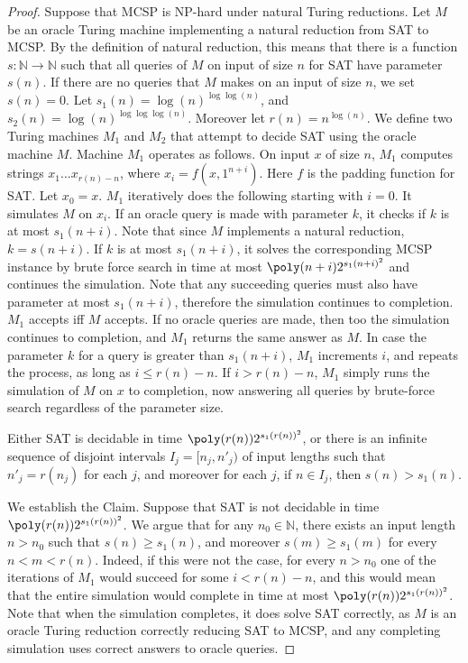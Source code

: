 \begin{proof}
Suppose that MCSP is NP-hard under natural Turing reductions. Let $M$ be an oracle Turing machine implementing a natural reduction from SAT to MCSP. By the definition of natural reduction, this means that there is a function $s:\mathbb N\to\mathbb N$ such that all queries of $M$ on input of size $n$ for SAT have parameter $s(n)$. If there are no queries that $M$ makes on an input of size $n$, we set $s(n)=0$.
Let $s_1(n)=\log(n)^{\log\log(n)}$, and $s_2(n)=\log(n)^{\log\log\log(n)}$. Moreover let $r(n)=n^{\log(n)}$. We define two Turing machines $M_1$ and $M_2$ that attempt to decide SAT using the oracle machine $M$.
Machine $M_1$ operates as follows. On input $x$ of size $n$, $M_1$ computes strings $x_1\ldots x_{r(n)-n}$, where $x_i=f(x,1^{n+i})$. Here $f$ is the padding function for SAT. Let $x_0=x$. $M_1$ iteratively does the following starting with $i=0$. It simulates $M$ on $x_i$. If an oracle query is made with parameter $k$, it checks if $k$ is at most $s_1(n+i)$. Note that since $M$ implements a natural reduction, $k=s(n+i)$. If $k$ is at most $s_1(n+i)$, it solves the corresponding MCSP instance by brute force search in time at most $\poly(n+i)2^{s_1(n+i)^2}$ and continues the simulation. Note that any succeeding queries must also have parameter at most $s_1(n+i)$, therefore the simulation continues to completion. $M_1$ accepts iff $M$ accepts. If no oracle queries are made, then too the simulation continues to completion, and $M_1$ returns the same answer as $M$.
In case the parameter $k$ for a query is greater than $s_1(n+i)$, $M_1$ increments $i$, and repeats the process, as long as $i\leq r(n)-n$. If $i>r(n)-n$, $M_1$ simply runs the simulation of $M$ on $x$ to completion, now answering all queries by brute-force search regardless of the parameter size.
\begin{ntclaim}
Either SAT is decidable in time $\poly(r(n))2^{s_1(r(n))^2}$, or there is an infinite sequence of disjoint intervals $I_j=[n_j,n'_j)$ of input lengths such that $n'_j=r(n_j)$ for each $j$, and moreover for each $j$, if $n\in I_j$, then $s(n)>s_1(n)$.
\end{ntclaim}
We establish the Claim. Suppose that SAT is not decidable in time $\poly(r(n))2^{s_1(r(n))^2}$. We argue that for any $n_0\in\mathbb N$, there exists an input length $n>n_0$ such that $s(n)\geq s_1(n)$, and moreover $s(m)\geq s_1(m)$ for every $n<m<r(n)$. Indeed, if this were not the case, for every $n>n_0$ one of the iterations of $M_1$ would succeed for some $i<r(n)-n$, and this would mean that the entire simulation would complete in time at most $\poly(r(n))2^{s_1(r(n))^2}$. Note that when the simulation completes, it does solve SAT correctly, as $M$ is an oracle Turing reduction correctly reducing SAT to MCSP, and any completing simulation uses correct answers to oracle queries.

\end{proof}
